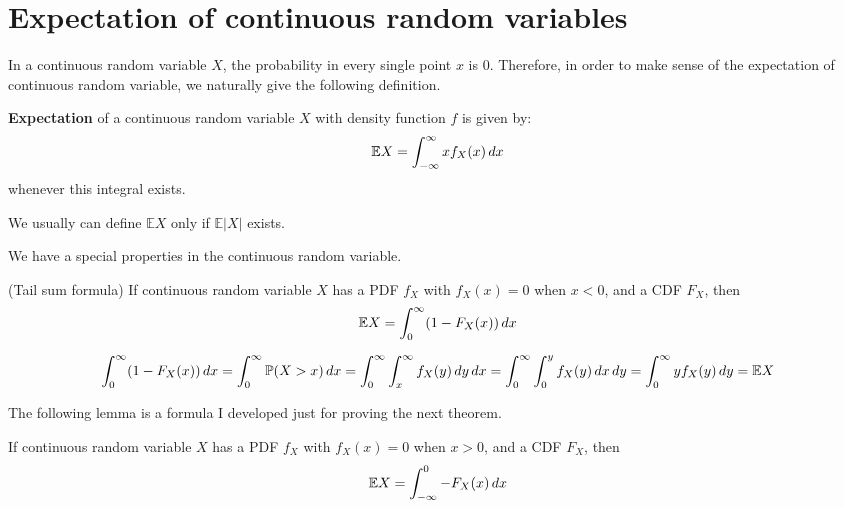 \documentclass{huhtakm-template-book}
\newcommand{\prob}{\mathbb{P}}
\newcommand{\expect}{\mathbb{E}}
\begin{document}
\section{Expectation of continuous random variables}
    In a continuous random variable $X$, the probability in every single point $x$ is $0$. Therefore, in order to make sense of the expectation of continuous random variable, we naturally give the following definition.
    \begin{defn}
        \textbf{Expectation} of a continuous random variable $X$ with density function $f$ is given by:
        \begin{equation*}
            \expect X=\intinfty xf_{X}(x)\,dx
        \end{equation*}
        whenever this integral exists.
    \end{defn}
    \begin{rem}
        We usually can define $\expect X$ only if $\expect|X|$ exists.
    \end{rem}
    We have a special properties in the continuous random variable.
    \begin{lem}(Tail sum formula)
        \label{expectation as integral of additive inverse of cdf}
        If continuous random variable $X$ has a PDF $f_{X}$ with $f_{X}(x)=0$ when $x<0$, and a CDF $F_{X}$, then
        \begin{equation*}
            \expect X=\intlu{0}{\infty}(1-F_{X}(x))\,dx
        \end{equation*}
    \end{lem}
    \begin{proofing}
        \begin{equation*}
            \intlu{0}{\infty}(1-F_{X}(x))\,dx=\intlu{0}{\infty}\prob(X>x)\,dx=\intlu{0}{\infty}\intlu{x}{\infty}f_{X}(y)\,dy\,dx=\intlu{0}{\infty}\intlu{0}{y}f_{X}(y)\,dx\,dy=\intlu{0}{\infty}yf_{X}(y)\,dy=\expect X
        \end{equation*}
    \end{proofing}
    The following lemma is a formula I developed just for proving the next theorem.
    \begin{lem}
        \label{expectation as integral of cdf}
        If continuous random variable $X$ has a PDF $f_{X}$ with $f_{X}(x)=0$ when $x>0$, and a CDF $F_{X}$, then
        \begin{equation*}
            \expect X=\intlu{-\infty}{0}-F_{X}(x)\,dx
        \end{equation*}
    \end{lem}
\end{document}
